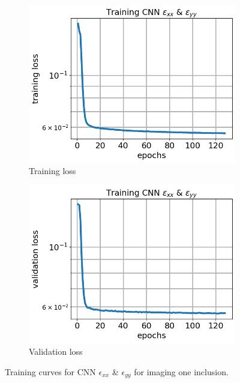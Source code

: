 \documentclass[12pt]{article}
\newcommand{\nhgfigheight}{4.0cm}
\begin{document}
%
\begin{figure}[h]
  \centering
  \begin{subfigure}[b]{0.45\linewidth}
    \includegraphics[totalheight=\nhgfigheight]{Figures/final1/training/exxeyy/field_strainxxyy_plot_loss.png}
    \caption{Training loss}
  \end{subfigure}
  \begin{subfigure}[b]{0.45\linewidth}
    \includegraphics[totalheight=\nhgfigheight]{Figures/final1/training/exxeyy/field_strainxxyy_plot_val_loss.png}
    \caption{Validation loss}
  \end{subfigure}
\caption{\label{fig:oneinc:trainexxeyy} Training curves for CNN $\epsilon_{xx}$ \& $\epsilon_{yy}$ for imaging one inclusion.}
\end{figure}
\end{document}
